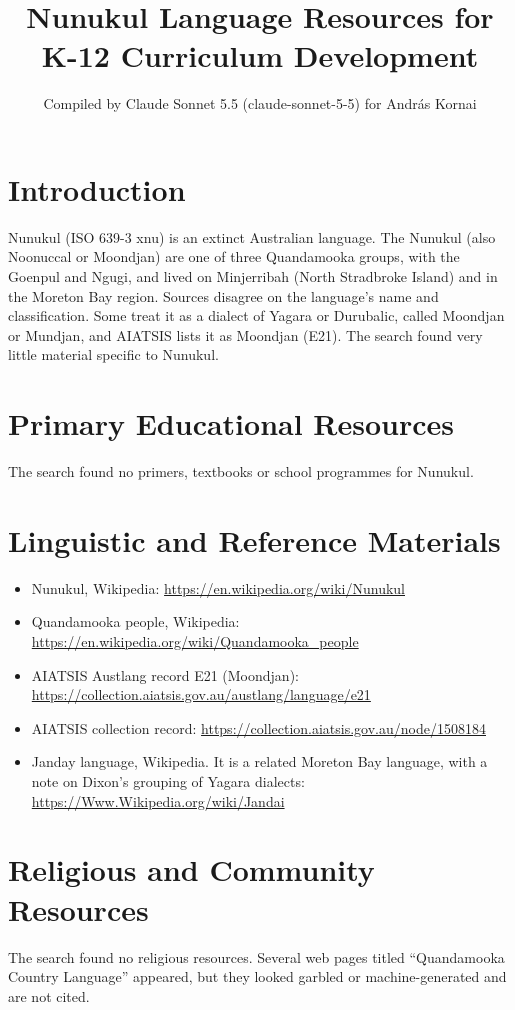 \documentclass[12pt]{article}
\title{Nunukul Language Resources for K-12 Curriculum Development}
\author{Compiled by Claude Sonnet 5.5 (claude-sonnet-5-5) for Andr\'as Kornai}
\date{}
\begin{document}
\maketitle

\section{Introduction}
Nunukul (ISO 639-3 xnu) is an extinct Australian language. The Nunukul (also Noonuccal or Moondjan) are one of three Quandamooka groups, with the Goenpul and Ngugi, and lived on Minjerribah (North Stradbroke Island) and in the Moreton Bay region. Sources disagree on the language's name and classification. Some treat it as a dialect of Yagara or Durubalic, called Moondjan or Mundjan, and AIATSIS lists it as Moondjan (E21). The search found very little material specific to Nunukul.

\section{Primary Educational Resources}
The search found no primers, textbooks or school programmes for Nunukul.

\section{Linguistic and Reference Materials}
\begin{itemize}
\item Nunukul, Wikipedia: \url{https://en.wikipedia.org/wiki/Nunukul}
\item Quandamooka people, Wikipedia: \url{https://en.wikipedia.org/wiki/Quandamooka_people}
\item AIATSIS Austlang record E21 (Moondjan): \url{https://collection.aiatsis.gov.au/austlang/language/e21}
\item AIATSIS collection record: \url{https://collection.aiatsis.gov.au/node/1508184}
\item Janday language, Wikipedia. It is a related Moreton Bay language, with a note on Dixon's grouping of Yagara dialects: \url{https://Www.Wikipedia.org/wiki/Jandai}
\end{itemize}

\section{Religious and Community Resources}
The search found no religious resources. Several web pages titled ``Quandamooka Country Language'' appeared, but they looked garbled or machine-generated and are not cited.
\end{document}

